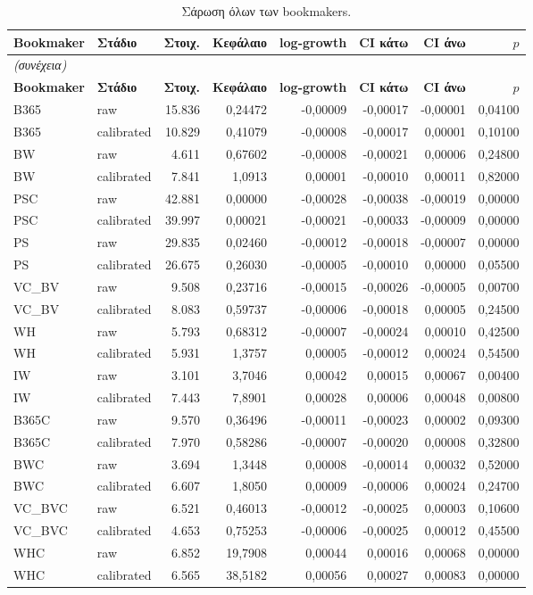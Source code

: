 {\footnotesize
\begin{longtable}{@{}llrrrrrr@{}}
\caption{Σάρωση όλων των bookmakers.}\label{app:vball}\\
\toprule \textbf{Bookmaker} & \textbf{Στάδιο} & \textbf{Στοιχ.} & \textbf{Κεφάλαιο} & \textbf{log-growth} & \textbf{CI κάτω} & \textbf{CI άνω} & \textbf{$p$} \\\midrule\endfirsthead
\multicolumn{8}{l}{\emph{(συνέχεια)}}\\\toprule \textbf{Bookmaker} & \textbf{Στάδιο} & \textbf{Στοιχ.} & \textbf{Κεφάλαιο} & \textbf{log-growth} & \textbf{CI κάτω} & \textbf{CI άνω} & \textbf{$p$} \\\midrule\endhead
\bottomrule\endfoot
B365 & raw & 15.836 & 0,24472 & -0,00009 & -0,00017 & -0,00001 & 0,04100 \\
B365 & calibrated & 10.829 & 0,41079 & -0,00008 & -0,00017 & 0,00001 & 0,10100 \\
BW & raw & 4.611 & 0,67602 & -0,00008 & -0,00021 & 0,00006 & 0,24800 \\
BW & calibrated & 7.841 & 1,0913 & 0,00001 & -0,00010 & 0,00011 & 0,82000 \\
PSC & raw & 42.881 & 0,00000 & -0,00028 & -0,00038 & -0,00019 & 0,00000 \\
PSC & calibrated & 39.997 & 0,00021 & -0,00021 & -0,00033 & -0,00009 & 0,00000 \\
PS & raw & 29.835 & 0,02460 & -0,00012 & -0,00018 & -0,00007 & 0,00000 \\
PS & calibrated & 26.675 & 0,26030 & -0,00005 & -0,00010 & 0,00000 & 0,05500 \\
VC\_BV & raw & 9.508 & 0,23716 & -0,00015 & -0,00026 & -0,00005 & 0,00700 \\
VC\_BV & calibrated & 8.083 & 0,59737 & -0,00006 & -0,00018 & 0,00005 & 0,24500 \\
WH & raw & 5.793 & 0,68312 & -0,00007 & -0,00024 & 0,00010 & 0,42500 \\
WH & calibrated & 5.931 & 1,3757 & 0,00005 & -0,00012 & 0,00024 & 0,54500 \\
IW & raw & 3.101 & 3,7046 & 0,00042 & 0,00015 & 0,00067 & 0,00400 \\
IW & calibrated & 7.443 & 7,8901 & 0,00028 & 0,00006 & 0,00048 & 0,00800 \\
B365C & raw & 9.570 & 0,36496 & -0,00011 & -0,00023 & 0,00002 & 0,09300 \\
B365C & calibrated & 7.970 & 0,58286 & -0,00007 & -0,00020 & 0,00008 & 0,32800 \\
BWC & raw & 3.694 & 1,3448 & 0,00008 & -0,00014 & 0,00032 & 0,52000 \\
BWC & calibrated & 6.607 & 1,8050 & 0,00009 & -0,00006 & 0,00024 & 0,24700 \\
VC\_BVC & raw & 6.521 & 0,46013 & -0,00012 & -0,00025 & 0,00003 & 0,10600 \\
VC\_BVC & calibrated & 4.653 & 0,75253 & -0,00006 & -0,00025 & 0,00012 & 0,45500 \\
WHC & raw & 6.852 & 19,7908 & 0,00044 & 0,00016 & 0,00068 & 0,00000 \\
WHC & calibrated & 6.565 & 38,5182 & 0,00056 & 0,00027 & 0,00083 & 0,00000 \\
\end{longtable}
}

